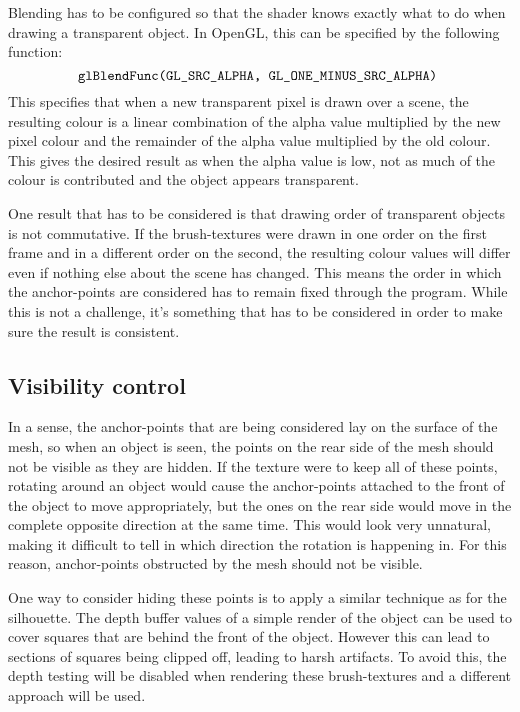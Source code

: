 \documentclass[a4paper, 12pt]{article}
\begin{document}
Blending has to be configured so that the shader knows exactly what to do when drawing a transparent object. In OpenGL, this can be specified by the following function:
$$\texttt{glBlendFunc(GL\_SRC\_ALPHA, GL\_ONE\_MINUS\_SRC\_ALPHA)\;}$$
This specifies that when a new transparent pixel is drawn over a scene, the resulting colour is a linear combination of the alpha value multiplied by the new pixel colour and the remainder of the alpha value multiplied by the old colour. This gives the desired result as when the alpha value is low, not as much of the colour is contributed and the object appears transparent.

One result that has to be considered is that drawing order of transparent objects is not commutative. If the brush-textures were drawn in one order on the first frame and in a different order on the second, the resulting colour values will differ even if nothing else about the scene has changed. This means the order in which the anchor-points are considered has to remain fixed through the program. While this is not a challenge, it's something that has to be considered in order to make sure the result is consistent.


\subsection{Visibility control}
In a sense, the anchor-points that are being considered lay on the surface of the mesh, so when an object is seen, the points on the rear side of the mesh should not be visible as they are hidden. If the texture were to keep all of these points, rotating around an object would cause the anchor-points attached to the front of the object to move appropriately, but the ones on the rear side would move in the complete opposite direction at the same time. This would look very unnatural, making it difficult to tell in which direction the rotation is happening in. For this reason, anchor-points obstructed by the mesh should not be visible.

One way to consider hiding these points is to apply a similar technique as for the silhouette. The depth buffer values of a simple render of the object can be used to cover squares that are behind the front of the object. However this can lead to sections of squares being clipped off, leading to harsh artifacts. To avoid this, the depth testing will be disabled when rendering these brush-textures and a different approach will be used.
\end{document}

